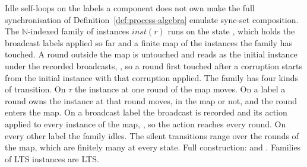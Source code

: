 \begin{definition}
  \label{def:idle-family}
  \leanok
  Idle self-loops on the labels a component does not own make the full synchronisation of Definition~\ref{def:process-algebra} emulate sync-set composition.
  The $\mathbb{N}$-indexed family of instances $inst(r)$ runs on the state , which holds the broadcast labels applied so far and a finite map of the instances the family has touched.
  A round outside the map is untouched and reads as the initial instance under the recorded broadcasts, , so a round first touched after a corruption starts from the initial instance with that corruption applied.
  The family has four kinds of transition.
  On $\tau$ the instance at one round of the map moves.
  On a label a round owns the instance at that round moves, in the map or not, and the round enters the map.
  On a broadcast label the broadcast is recorded and its action applied to every instance of the map, , so the action reaches every round.
  On every other label the family idles.
  The silent transitions range over the rounds of the map, which are finitely many at every state.
  Full construction:  and .
  Families of LTS instances are LTS.\leanok
\end{definition}
